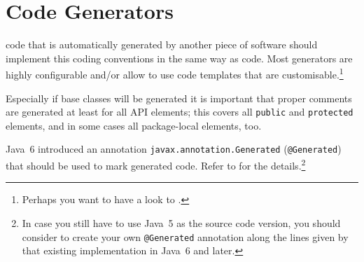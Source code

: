\section{Code Generators}
\Java code that is automatically generated by another piece of software should implement this coding conventions in the same way as  code. Most generators are highly configurable and/or allow to use code templates that are customisable.\footnote{Perhaps you want to have a look to \autocite{TQUADRAT_ORG_FOUNDATION_JAVACOMPOSER}.}

Especially if base classes will be generated it is important that proper comments are generated at least for all API elements; this covers all \lstinline|public| and \lstinline|protected| elements, and in some cases all package-local elements, too.

Java~6 introduced an annotation \lstinline|javax.annotation.Generated| (\lstinline|@Generated|) that should be used to mark generated code. Refer to \autocite{ORACLE_DOC_GENERATED_ANNOTATION} for the details.\footnote{In case you still have to use Java~5 as the source code version, you should consider to create your own \lstinline|@Generated| annotation along the lines given by that existing implementation in Java~6 and later.}

